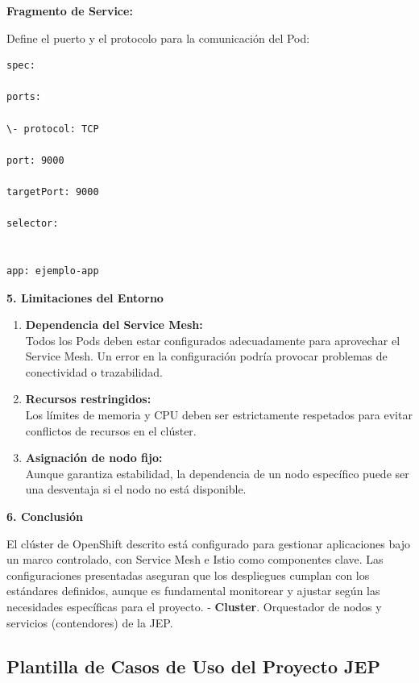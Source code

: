 \documentclass[
  paper=a4,
  ,captions=tableheading
]{scrartcl}
\providecommand{\tightlist}{%
  \setlength{\itemsep}{0pt}\setlength{\parskip}{0pt}}
\begin{document}
\textbf{Fragmento de Service:}

Define el puerto y el protocolo para la comunicación del Pod:

\begin{verbatim}
spec:

ports:

\- protocol: TCP

port: 9000

targetPort: 9000

selector:


app: ejemplo-app
\end{verbatim}

\textbf{5. Limitaciones del Entorno}

\begin{enumerate}
\def\labelenumi{\arabic{enumi}.}
\tightlist
\item
  \textbf{Dependencia del Service Mesh:}\\
  Todos los Pods deben estar configurados adecuadamente para aprovechar
  el Service Mesh. Un error en la configuración podría provocar
  problemas de conectividad o trazabilidad.
\item
  \textbf{Recursos restringidos:}\\
  Los límites de memoria y CPU deben ser estrictamente respetados para
  evitar conflictos de recursos en el clúster.
\item
  \textbf{Asignación de nodo fijo:}\\
  Aunque garantiza estabilidad, la dependencia de un nodo específico
  puede ser una desventaja si el nodo no está disponible.
\end{enumerate}

\textbf{6. Conclusión}

El clúster de OpenShift descrito está configurado para gestionar
aplicaciones bajo un marco controlado, con Service Mesh e Istio como
componentes clave. Las configuraciones presentadas aseguran que los
despliegues cumplan con los estándares definidos, aunque es fundamental
monitorear y ajustar según las necesidades específicas para el proyecto.
- \textbf{Cluster}. Orquestador de nodos y servicios (contendores) de la
JEP.

\subsection{Plantilla de Casos de Uso del Proyecto
JEP}\label{sec:plantilla-de-casos-de-uso-del-proyecto-jep}
\end{document}
